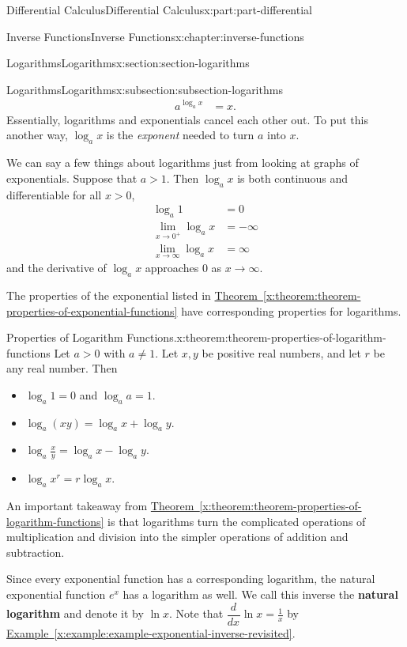 \documentclass[twoside,10pt,]{tufte-book}
\newcommand{\xreffont}{\relax}
\newcommand{\terminology}[1]{\textbf{#1}}
\numberwithin{equation}{part}
\newcommand{\dv}[3][]{\dfrac{d^{#1} #2}{d #3^{#1}}}
\begin{document}
\begin{partptx}{Differential Calculus}{}{Differential Calculus}{}{}{x:part:part-differential}
\begin{chapterptx}{Inverse Functions}{}{Inverse Functions}{}{}{x:chapter:inverse-functions}
\begin{sectionptx}{Logarithms}{}{Logarithms}{}{}{x:section:section-logarithms}
\begin{subsectionptx}{Logarithms}{}{Logarithms}{}{}{x:subsection:subsection-logarithms}
\begin{align*}
a^{\log_{a}x} & = x. 
\end{align*}
Essentially, logarithms and exponentials cancel each other out. To put this another way, \(\log_{a}x\) is the \emph{exponent} needed to turn \(a\) into \(x\).%
\par
We can say a few things about logarithms just from looking at graphs of exponentials. Suppose that \(a>1\). Then \(\log_{a}x\) is both continuous and differentiable for all \(x>0\),%
\begin{align*}
\log_{a}1 & = 0 \\
\lim_{x\to0^{+}}\log_{a}x & = -\infty \\
\lim_{x\to\infty}\log_{a}x & = \infty 
\end{align*}
and the derivative of \(\log_{a}x\) approaches \(0\) as \(x\to\infty\).%
\par
The properties of the exponential listed in \hyperref[x:theorem:theorem-properties-of-exponential-functions]{Theorem~{\xreffont\ref{x:theorem:theorem-properties-of-exponential-functions}}} have corresponding properties for logarithms.%
\begin{theorem}{Properties of Logarithm Functions.}{}{x:theorem:theorem-properties-of-logarithm-functions}%
%
Let \(a>0\) with \(a\neq1\). Let \(x,y\) be positive real numbers, and let \(r\) be any real number. Then%
\begin{itemize}[label=\textbullet]
\item{}\(\log_{a}1 = 0\) and \(\log_{a}a = 1\).%
\item{}\(\log_{a}(xy) = \log_{a}x + \log_{a}y\).%
\item{}\(\log_{a}\frac{x}{y} = \log_{a}x - \log_{a}y\).%
\item{}\(\log_{a}x^{r} = r\log_{a}x\).%
\end{itemize}
%
\end{theorem}
An important takeaway from \hyperref[x:theorem:theorem-properties-of-logarithm-functions]{Theorem~{\xreffont\ref{x:theorem:theorem-properties-of-logarithm-functions}}} is that logarithms turn the complicated operations of multiplication and division into the simpler operations of addition and subtraction.%
\par
Since every exponential function has a corresponding logarithm, the natural exponential function \(e^{x}\) has a logarithm as well. We call this inverse the \terminology{natural logarithm} and denote it by \(\ln x\). Note that \(\dv{}{x}\ln x = \frac{1}{x}\) by \hyperref[x:example:example-exponential-inverse-revisited]{Example~{\xreffont\ref{x:example:example-exponential-inverse-revisited}}}.%

\end{subsectionptx}
\end{sectionptx}
\end{chapterptx}
\end{partptx}
\end{document}
